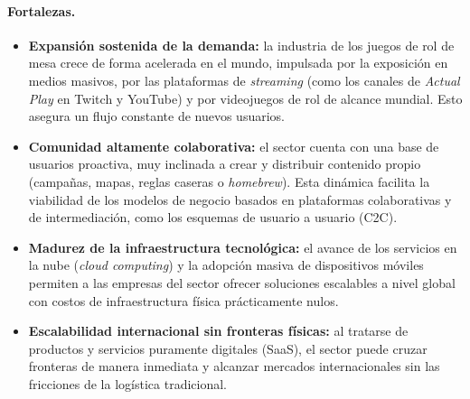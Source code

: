 \paragraph{Fortalezas.}
\begin{itemize}
  \item \textbf{Expansión sostenida de la demanda:} la industria de los juegos de rol de mesa crece de forma acelerada en el mundo, impulsada por la exposición en medios masivos, por las plataformas de \textit{streaming} (como los canales de \textit{Actual Play} en Twitch y YouTube) y por videojuegos de rol de alcance mundial. Esto asegura un flujo constante de nuevos usuarios.
  \item \textbf{Comunidad altamente colaborativa:} el sector cuenta con una base de usuarios proactiva, muy inclinada a crear y distribuir contenido propio (campañas, mapas, reglas caseras o \textit{homebrew}). Esta dinámica facilita la viabilidad de los modelos de negocio basados en plataformas colaborativas y de intermediación, como los esquemas de usuario a usuario (C2C).
  \item \textbf{Madurez de la infraestructura tecnológica:} el avance de los servicios en la nube (\textit{cloud computing}) y la adopción masiva de dispositivos móviles permiten a las empresas del sector ofrecer soluciones escalables a nivel global con costos de infraestructura física prácticamente nulos.
  \item \textbf{Escalabilidad internacional sin fronteras físicas:} al tratarse de productos y servicios puramente digitales (SaaS), el sector puede cruzar fronteras de manera inmediata y alcanzar mercados internacionales sin las fricciones de la logística tradicional.
\end{itemize}

